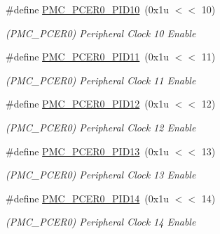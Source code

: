 \begin{DoxyCompactItemize}
\mbox{\label{group__SAMS70__PMC_gab8555796956459c17ec1dc31e355b6cd}} 
\#define \mbox{\hyperlink{group__SAMS70__PMC_gab8555796956459c17ec1dc31e355b6cd}{P\+M\+C\+\_\+\+P\+C\+E\+R0\+\_\+\+P\+I\+D10}}~(0x1u $<$$<$ 10)
\begin{DoxyCompactList}\small\item\em (P\+M\+C\+\_\+\+P\+C\+E\+R0) Peripheral Clock 10 Enable \end{DoxyCompactList}\item 
\mbox{\label{group__SAMS70__PMC_gab4a377380f7e755be2648d7654a65a63}} 
\#define \mbox{\hyperlink{group__SAMS70__PMC_gab4a377380f7e755be2648d7654a65a63}{P\+M\+C\+\_\+\+P\+C\+E\+R0\+\_\+\+P\+I\+D11}}~(0x1u $<$$<$ 11)
\begin{DoxyCompactList}\small\item\em (P\+M\+C\+\_\+\+P\+C\+E\+R0) Peripheral Clock 11 Enable \end{DoxyCompactList}\item 
\mbox{\label{group__SAMS70__PMC_ga3232ab38b8975e656d135e27448d81a7}} 
\#define \mbox{\hyperlink{group__SAMS70__PMC_ga3232ab38b8975e656d135e27448d81a7}{P\+M\+C\+\_\+\+P\+C\+E\+R0\+\_\+\+P\+I\+D12}}~(0x1u $<$$<$ 12)
\begin{DoxyCompactList}\small\item\em (P\+M\+C\+\_\+\+P\+C\+E\+R0) Peripheral Clock 12 Enable \end{DoxyCompactList}\item 
\mbox{\label{group__SAMS70__PMC_gad4d053d7ffc769945e31e107cd6fba9a}} 
\#define \mbox{\hyperlink{group__SAMS70__PMC_gad4d053d7ffc769945e31e107cd6fba9a}{P\+M\+C\+\_\+\+P\+C\+E\+R0\+\_\+\+P\+I\+D13}}~(0x1u $<$$<$ 13)
\begin{DoxyCompactList}\small\item\em (P\+M\+C\+\_\+\+P\+C\+E\+R0) Peripheral Clock 13 Enable \end{DoxyCompactList}\item 
\mbox{\label{group__SAMS70__PMC_ga303297a5080043b0d08026a64c8bf34e}} 
\#define \mbox{\hyperlink{group__SAMS70__PMC_ga303297a5080043b0d08026a64c8bf34e}{P\+M\+C\+\_\+\+P\+C\+E\+R0\+\_\+\+P\+I\+D14}}~(0x1u $<$$<$ 14)
\begin{DoxyCompactList}\small\item\em (P\+M\+C\+\_\+\+P\+C\+E\+R0) Peripheral Clock 14 Enable \end{DoxyCompactList}\item 
$$
\end{DoxyCompactItemize}
